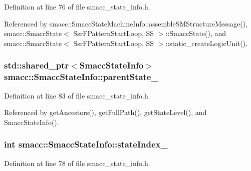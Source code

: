 Definition at line 76 of file smacc\+\_\+state\+\_\+info.\+h.



Referenced by smacc\+::\+Smacc\+State\+Machine\+Info\+::assemble\+S\+M\+Structure\+Message(), smacc\+::\+Smacc\+State$<$ Ssr\+F\+Pattern\+Start\+Loop, S\+S $>$\+::\+Smacc\+State(), and smacc\+::\+Smacc\+State$<$ Ssr\+F\+Pattern\+Start\+Loop, S\+S $>$\+::static\+\_\+create\+Logic\+Unit().

\subsubsection[{\texorpdfstring{parent\+State\+\_\+}{parentState_}}]{\setlength{\rightskip}{0pt plus 5cm}std\+::shared\+\_\+ptr$<${\bf Smacc\+State\+Info}$>$ smacc\+::\+Smacc\+State\+Info\+::parent\+State\+\_\+}\hypertarget{classsmacc_1_1SmaccStateInfo_ae19f4efbeb2ca665b320df80766d9209}{}\label{classsmacc_1_1SmaccStateInfo_ae19f4efbeb2ca665b320df80766d9209}


Definition at line 83 of file smacc\+\_\+state\+\_\+info.\+h.



Referenced by get\+Ancestors(), get\+Full\+Path(), get\+State\+Level(), and Smacc\+State\+Info().

\subsubsection[{\texorpdfstring{state\+Index\+\_\+}{stateIndex_}}]{\setlength{\rightskip}{0pt plus 5cm}int smacc\+::\+Smacc\+State\+Info\+::state\+Index\+\_\+}\hypertarget{classsmacc_1_1SmaccStateInfo_a43292879ca69576cb835a1cf3f119826}{}\label{classsmacc_1_1SmaccStateInfo_a43292879ca69576cb835a1cf3f119826}


Definition at line 78 of file smacc\+\_\+state\+\_\+info.\+h.

